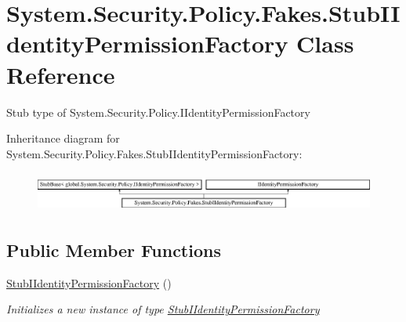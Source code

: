 \hypertarget{class_system_1_1_security_1_1_policy_1_1_fakes_1_1_stub_i_identity_permission_factory}{\section{System.\-Security.\-Policy.\-Fakes.\-Stub\-I\-Identity\-Permission\-Factory Class Reference}
\label{class_system_1_1_security_1_1_policy_1_1_fakes_1_1_stub_i_identity_permission_factory}
}


Stub type of System.\-Security.\-Policy.\-I\-Identity\-Permission\-Factory 


Inheritance diagram for System.\-Security.\-Policy.\-Fakes.\-Stub\-I\-Identity\-Permission\-Factory\-:\begin{figure}[H]
\begin{center}
\leavevmode
\includegraphics[height=1.342926cm]{class_system_1_1_security_1_1_policy_1_1_fakes_1_1_stub_i_identity_permission_factory}
\end{center}
\end{figure}
\subsection*{Public Member Functions}
\begin{DoxyCompactItemize}
\item 
\hyperlink{class_system_1_1_security_1_1_policy_1_1_fakes_1_1_stub_i_identity_permission_factory_a57e5fb0cce63fb98d5a75b9c3424f843}{Stub\-I\-Identity\-Permission\-Factory} ()
\begin{DoxyCompactList}\small\item\em Initializes a new instance of type \hyperlink{class_system_1_1_security_1_1_policy_1_1_fakes_1_1_stub_i_identity_permission_factory}{Stub\-I\-Identity\-Permission\-Factory}\end{DoxyCompactList}\end{DoxyCompactItemize}
